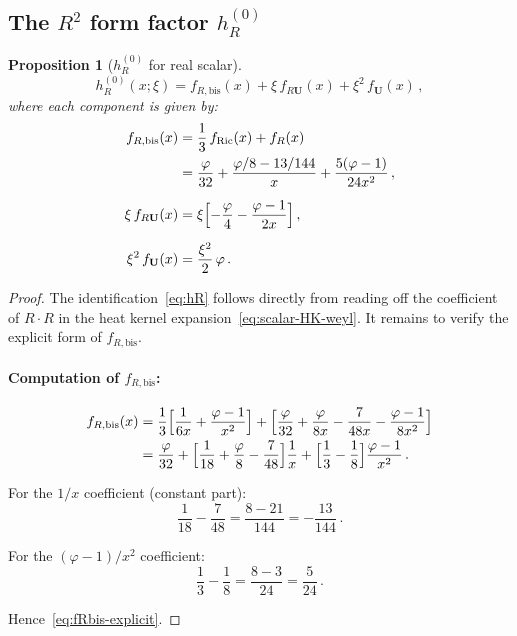\documentclass[11pt,a4paper]{article}
\newtheorem{proposition}[theorem]{Proposition}
\theoremstyle{definition}
\theoremstyle{remark}
\begin{document}
\subsection{The $R^2$ form factor $h_R^{(0)}$}

\begin{proposition}[$h_R^{(0)}$ for real scalar]
\label{prop:hR}
\begin{equation}
  \boxed{
  h_R^{(0)}(x;\xi) = f_{R,\text{bis}}(x)
    + \xi\,f_{R\mathbf{U}}(x) + \xi^2\,f_{\mathbf{U}}(x)\,,
  }
  \label{eq:hR}
\end{equation}
where each component is given by:
\begin{align}
  f_{R,\text{bis}}(x) &= \frac{1}{3}\,f_{\text{Ric}}(x) + f_R(x)
  \nonumber\\
  &= \frac{\varphi}{32}
  + \frac{\varphi/8 - 13/144}{x}
  + \frac{5(\varphi-1)}{24x^2}\,,
  \label{eq:fRbis-explicit}\\[6pt]
  \xi\,f_{R\mathbf{U}}(x) &= \xi\Bigl[
    -\frac{\varphi}{4} - \frac{\varphi - 1}{2x}\Bigr]\,,
  \label{eq:xi-fRU}\\[6pt]
  \xi^2\,f_{\mathbf{U}}(x) &= \frac{\xi^2}{2}\,\varphi\,.
  \label{eq:xi2-fU}
\end{align}
\end{proposition}

\begin{proof}
The identification~\eqref{eq:hR} follows directly from
reading off the coefficient of $R\cdot R$ in the heat kernel
expansion~\eqref{eq:scalar-HK-weyl}.  It remains to verify the
explicit form of $f_{R,\text{bis}}$.

\paragraph{Computation of $f_{R,\text{bis}}$:}
\begin{align*}
  f_{R,\text{bis}}(x)
  &= \frac{1}{3}\Bigl[\frac{1}{6x} + \frac{\varphi-1}{x^2}\Bigr]
  + \Bigl[\frac{\varphi}{32} + \frac{\varphi}{8x}
  - \frac{7}{48x} - \frac{\varphi-1}{8x^2}\Bigr]\\
  &= \frac{\varphi}{32}
  + \Bigl[\frac{1}{18} + \frac{\varphi}{8} - \frac{7}{48}\Bigr]
    \frac{1}{x}
  + \Bigl[\frac{1}{3} - \frac{1}{8}\Bigr]
    \frac{\varphi-1}{x^2}\,.
\end{align*}

For the $1/x$ coefficient (constant part):
\begin{equation*}
  \frac{1}{18} - \frac{7}{48}
  = \frac{8 - 21}{144} = -\frac{13}{144}\,.
\end{equation*}

For the $(\varphi-1)/x^2$ coefficient:
\begin{equation*}
  \frac{1}{3} - \frac{1}{8} = \frac{8-3}{24} = \frac{5}{24}\,.
\end{equation*}

Hence~\eqref{eq:fRbis-explicit}.
\end{proof}
\end{document}
